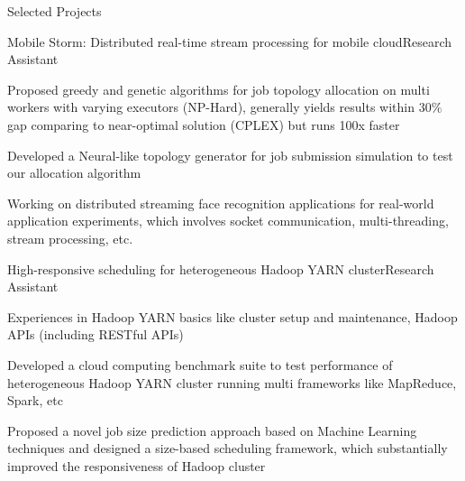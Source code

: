 \documentclass{resume} %
\begin{document}
\begin{rSection}{Selected Projects}
\begin{rSubsection}{Mobile Storm: Distributed real-time stream processing for mobile cloud}{Research Assistant}{}{}
\item Proposed greedy and genetic algorithms for job topology allocation on multi workers with varying executors (NP-Hard), generally yields results within $30\%$ gap comparing to near-optimal solution (CPLEX) but runs 100x faster
\item Developed a Neural-like topology generator for job submission simulation to test our allocation algorithm
\item Working on distributed streaming face recognition applications for real-world application experiments, which involves socket communication, multi-threading, stream processing, etc.

\end{rSubsection}

\begin{rSubsection}{High-responsive scheduling for heterogeneous Hadoop YARN cluster}{Research Assistant}{}{}
\item Experiences in Hadoop YARN basics like cluster setup and maintenance, Hadoop APIs (including RESTful APIs)
\item Developed a cloud computing benchmark suite to test performance of heterogeneous Hadoop YARN cluster running multi frameworks like MapReduce, Spark, etc
\item Proposed a novel job size prediction approach based on Machine Learning techniques and designed a size-based scheduling framework, which substantially improved the responsiveness of Hadoop cluster

\end{rSubsection}






\end{rSection}
\end{document}
